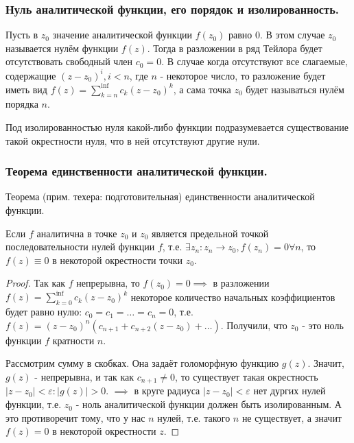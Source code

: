 \subsubsection{Нуль аналитической функции, его порядок и изолированность.}

Пусть в $z_0$ значение аналитической функции $f(z_0)$ равно 0. В этом случае $z_0$ называется нулём функции $f(z)$. Тогда в разложении в ряд Тейлора будет отсутствовать свободный член $c_0=0$. В случае когда отсутствуют все слагаемые, содержащие $(z - z_0)^i, i < n$, где $n$ - некоторое число, то разложение будет иметь вид $f(z) = \sum_{k=n}^{\inf}c_k(z-z_0)^k$, а сама точка $z_0$ будет называться нулём порядка $n$.

Под изолированностью нуля какой-либо функции подразумевается существование такой окрестности нуля, что в ней отсутствуют другие нули.

\subsubsection{Теорема единственности аналитической функции.}

\begin{theorem*}
	Теорема (прим. техера: подготовительная) единственности аналитической функции.
	
	Если $f$ аналитична в точке $z_0$ и $z_0$ является предельной точкой последовательности нулей функции $f$, т.е. $\exists{z_n}: z_n \rightarrow z_0, f(z_n) = 0 \forall n$, то $f(z)\equiv0$ в некоторой окрестности точки $z_0$.
\end{theorem*}

\begin{proof}
	Так как $f$ непрерывна, то $f(z_0) = 0 \implies$ в разложении $f(z) = \sum_{k=0}^{\inf} c_k(z-z_0)^k$ некоторое количество начальных коэффициентов будет равно нулю: $c_0 = c_1 = \dots = c_n = 0$, т.е. $f(z) = (z-z_0)^n (c_{n+1} + c_{n+2}(z-z_0) + \dots)$. Получили, что $z_0$ - это ноль функции $f$ кратности $n$.
	
	Рассмотрим сумму в скобках. Она задаёт голоморфную функцию $g(z)$. Значит, $g(z)$ - непрерывна, и так как $c_{n+1} \neq 0$, то существует такая окрестность $|z - z_0| < \varepsilon: |g(z)| > 0$. $\implies$ в круге радиуса $|z-z_0| < \varepsilon$ нет дургих нулей функции, т.е. $z_0$ - ноль аналитической функции должен быть изолированным. А это противоречит тому, что у нас $n$ нулей, т.е. такого $n$ не существует, а значит $f(z) = 0$ в некоторой окрестности $z$.
\end{proof}

